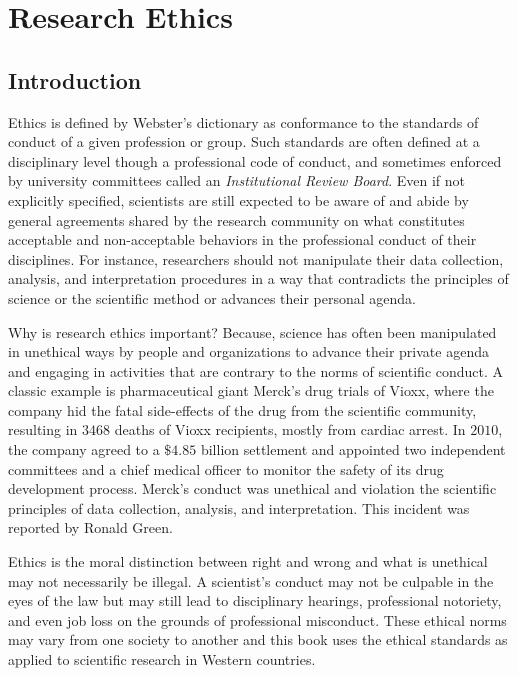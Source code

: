 \chapter{Research Ethics}\label{03:ethics}

\section{Introduction}

Ethics is defined by Webster's dictionary as conformance to the standards of conduct of a given profession or group. Such standards are often defined at a disciplinary level though a professional code of conduct, and sometimes enforced by university committees called an \textit{Institutional Review Board}. Even if not explicitly specified, scientists are still expected to be aware of and abide by general agreements shared by the research community on what constitutes acceptable and non-acceptable behaviors in the professional conduct of their disciplines. For instance, researchers should not manipulate their data collection, analysis, and interpretation procedures in a way that contradicts the principles of science or the scientific method or advances their personal agenda.

Why is research ethics important? Because, science has often been manipulated in unethical ways by people and organizations to advance their private agenda and engaging in activities that are contrary to the norms of scientific conduct. A classic example is pharmaceutical giant Merck’s drug trials of Vioxx, where the company hid the fatal side-effects of the drug from the scientific community, resulting in $ 3468 $ deaths of Vioxx recipients, mostly from cardiac arrest. In $ 2010 $, the company agreed to a $ \$4.85 $ billion settlement and appointed two independent committees and a chief medical officer to monitor the safety of its drug development process. Merck's conduct was unethical and violation the scientific principles of data collection, analysis, and interpretation. This incident was reported by Ronald Green\cite{green2006direct}.

Ethics is the moral distinction between right and wrong and what is unethical may not necessarily be illegal. A scientist's conduct may not be culpable in the eyes of the law but may still lead to disciplinary hearings, professional notoriety, and even job loss on the grounds of professional misconduct. These ethical norms may vary from one society to another and this book uses the ethical standards as applied to scientific research in Western countries.

